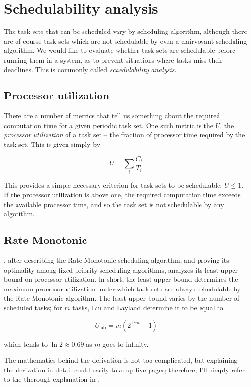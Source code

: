 \documentclass[twoside]{uva-inf-bachelor-thesis}
\begin{document}
\section{Schedulability analysis}
The task sets that can be scheduled vary by scheduling algorithm, although there are of course task sets which are not schedulable by even a clairvoyant scheduling algorithm. We would like to evaluate whether task sets are schedulable before running them in a system, as to prevent situations where tasks miss their deadlines. This is commonly called \emph{schedulability analysis}.

\subsection{Processor utilization}
There are a number of metrics that tell us something about the required computation time for a given periodic task set. One such metric is the $U$, the \emph{processor utilization} of a task set -- the fraction of processor time required by the task set. This is given simply by

\[ U = \sum_i \dfrac{C_i}{T_i} \]

This provides a simple necessary criterion for task sets to be schedulable: $U \le 1$. If the processor utilization is above one, the required computation time exceeds the available processor time, and so the task set is not schedulable by any algorithm.

\subsection{Rate Monotonic}
\textcite{Liu1973}, after describing the Rate Monotonic scheduling algorithm, and proving its optimality among fixed-priority scheduling algorithms, analyzes its least upper bound on processor utilization. In short, the least upper bound determines the maximum processor utilization under which task sets are always schedulable by the Rate Monotonic algorithm. The least upper bound varies by the number of scheduled tasks; for $m$ tasks, Liu and Layland determine it to be equal to

\[ U_{\text{lub}} = m(2^{1/m} - 1) \]

\noindent which tends to $\ln 2 \approx 0.69$ as $m$ goes to infinity.

The mathematics behind the derivation is not too complicated, but explaining the derivation in detail could easily take up five pages; therefore, I'll simply refer to the thorough explanation in \textcite[pp. 90-97]{buttazzo2011hard}.
\end{document}
